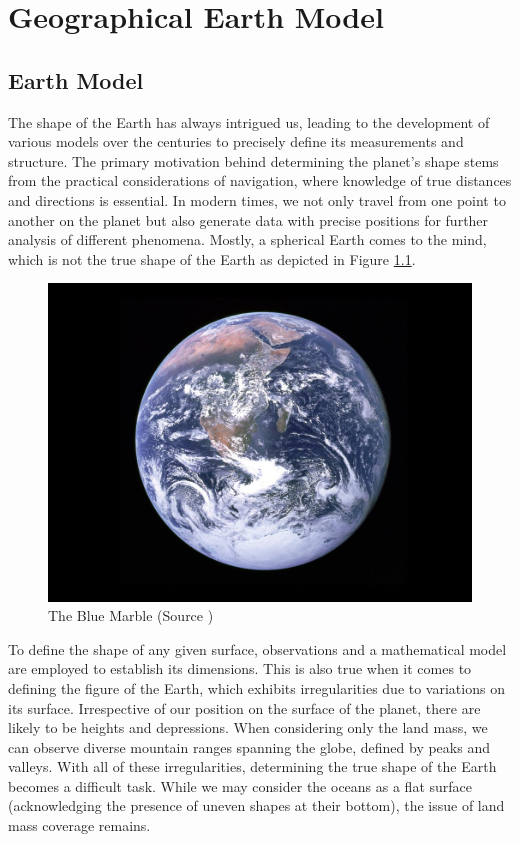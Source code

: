 
\clearpage
\cleardoublepage

\chapter{Geographical Earth Model}

\section{Earth Model}

The shape of the Earth has always intrigued us, leading to the development of various models over the centuries to precisely define its measurements and structure.
The primary motivation behind determining the planet's shape stems from the practical considerations of navigation, where knowledge of true distances and directions is essential.
In modern times, we not only travel from one point to another on the planet but also generate data with precise positions for further analysis of different phenomena.
Mostly, a spherical Earth comes to the mind, which is not the true shape of the Earth as depicted in Figure \ref{fig:earth-image}.

\begin{figure}[h]
    \centering
    \includegraphics[width=0.5\linewidth]{figures/chapter-2/earth.jpg}
    \caption{The Blue Marble (Source \cite{EARTH_IMAGE}) }
    \label{fig:earth-image}
\end{figure}


To define the shape of any given surface, observations and a mathematical model are employed to establish its dimensions.
This is also true when it comes to defining the figure of the Earth, which exhibits irregularities due to variations on its surface.
Irrespective of our position on the surface of the planet, there are likely to be heights and depressions. When considering only the land mass, we can observe diverse mountain ranges spanning the globe, defined by peaks and valleys.
With all of these irregularities, determining the true shape of the Earth becomes a difficult task.
While we may consider the oceans as a flat surface (acknowledging the presence of uneven shapes at their bottom), the issue of land mass coverage remains.

